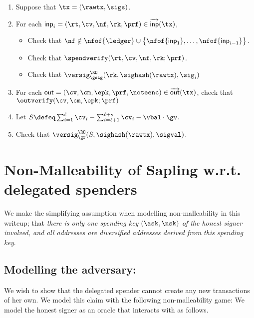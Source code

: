 \documentclass[11pt]{article}
\numberwithin{equation}{section} %
\numberwithin{figure}{section} %
\newcommand{\inp}{\ensuremath{\mathsf{inp}}\xspace}
\newcommand{\inps}{\ensuremath{\overrightarrow{\mathsf{inp}}}\xspace}
\newcommand{\outs}{\ensuremath{\overrightarrow{\mathsf{out}}}\xspace}
\newcommand{\out}{\ensuremath{\mathsf{out}}\xspace}
\newcommand{\set}[1]{\ensuremath{\left\{#1\right\}}\xspace}
\begin{document}
\begin{enumerate}
\item Suppose that $\tx=(\rawtx,\sigs)$.
\item For each $\inp_i =(\rt,\cv,\nf,\rk,\prf)\in \inps(\tx)$,
 \begin{itemize}
  \item Check that $\nf \notin \nfof{\ledger}\cup \set{\nfof{\inp_1},\ldots,\nfof{\inp_{i-1}}}$.
  \item Check that $\spendverify(\rt,\cv,\nf,\rk;\prf)$.
  \item Check that $\versig^{\RO}_{\gsig}(\rk,\sighash(\rawtx),\sig_i)$
 \end{itemize}
\item For each $\out = (\cv,\cm,\epk,\prf,\noteenc)\in\outs(\tx)$, check that  $\outverify(\cv,\cm,\epk;\prf)$
\item Let $S\defeq\sum_{i=1}^\ell \cv_i - \sum_{i=\ell+1}^{\ell+s}\cv_i-\vbal\cdot \gv$.
\item Check that $\versig^{\RO}_{\gr}(S,\sighash(\rawtx),\sigval)$.
\end{enumerate}







\section{Non-Malleability of Sapling w.r.t. delegated spenders}


We make the simplifying assumption when modelling non-malleability in this writeup; that \emph{there is only one spending key $(\ask,\nsk)$ of the honest signer  involved, and all addresses are diversified addresses derived from this spending key}.
\subsection*{Modelling the adversary:}

We wish to show that the delegated spender cannot create any new transactions of her own.
We model this claim with the following non-malleability game:
We model the honest signer as an oracle \oracle that \adv interacts with as follows.
% 
\end{document}
